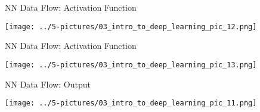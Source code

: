 \documentclass[11pt]{beamer}
\begin{document}
\begin{frame}{NN Data Flow: Activation Function}
	\begin{center}
	\texttt{[image: ../5-pictures/03\_intro\_to\_deep\_learning\_pic\_12.png]}
	\end{center}
\end{frame}
\begin{frame}{NN Data Flow: Activation Function}
	\begin{center}
	\texttt{[image: ../5-pictures/03\_intro\_to\_deep\_learning\_pic\_13.png]}
	\end{center}
\end{frame}
\begin{frame}{NN Data Flow: Output}
	\begin{center}
	\texttt{[image: ../5-pictures/03\_intro\_to\_deep\_learning\_pic\_11.png]}
	\end{center}
\end{frame}
\end{document}
